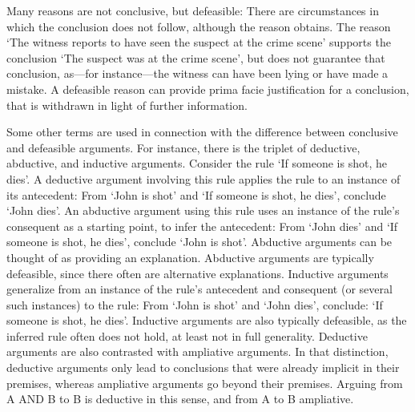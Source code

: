 \documentclass[10pt]{article}
\begin{document}
Many reasons are not conclusive, but defeasible: There are circumstances in which the conclusion does not follow, although the reason obtains. The reason `The witness reports to have seen the suspect at the crime scene' supports the conclusion `The suspect was at the crime scene', but does not guarantee that conclusion, as---for instance---the witness can have been lying or have made a mistake. A defeasible reason can provide prima facie justification for a conclusion, that is withdrawn in light of further information.


Some other terms are used in connection with the difference between conclusive and defeasible arguments. For instance, there is the triplet of deductive, abductive, and inductive arguments. Consider the rule `If someone is shot, he dies'. A deductive argument involving this rule applies the rule to an instance of its antecedent: From `John is shot' and `If someone is shot, he dies', conclude `John dies'. An abductive argument using this rule uses an instance of the rule's consequent as a starting point, to infer the antecedent: From `John dies' and  `If someone is shot, he dies', conclude `John is shot'. Abductive arguments can be thought of as providing an explanation. Abductive arguments are typically defeasible, since there often are alternative explanations. Inductive arguments generalize from an instance of the rule's antecedent and consequent (or several such instances) to the rule: From `John is shot' and `John dies', conclude: `If someone is shot, he dies'. Inductive arguments are also typically defeasible, as the inferred rule often does not hold, at least not in full generality. Deductive arguments are also contrasted with ampliative arguments. In that distinction, deductive arguments only lead to conclusions that were already implicit in their premises, whereas ampliative arguments go beyond their premises. Arguing from A AND B to B is deductive in this sense, and from A to B ampliative.

\end{document}
